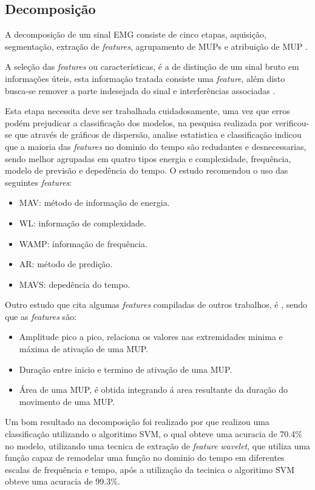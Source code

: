 \subsection{Decomposição}
A decomposição de um sinal EMG consiste de cinco etapas, aquisição, segmentação, extração de \textit{features}, agrupamento de MUPs e atribuição de MUP \cite{yousefi2014characterizing}.

A seleção das \textit{features} ou características, é a de distinção de um sinal bruto em informações úteis, esta informação tratada consiste uma \textit{feature}, além disto busca-se remover a parte indesejada do sinal e interferências associadas \cite{phinyomark2012feature}.

Esta etapa necessita deve ser trabalhada cuidadosamente, uma vez que erros podém prejudicar a classificação dos modelos, na pesquisa realizada por \cite{phinyomark2012feature} verificou-se que através de gráficos de dispersão, analise estatistica e classificação indicou que a maioria das \textit{features} no dominio do tempo são redudantes e desnecessarias, sendo melhor agrupadas em quatro tipos energia e complexidade, frequência, modelo de previsão e depedência do tempo. O estudo recomendou o uso das seguintes \textit{features}:

\begin{itemize}
    \item MAV: método de informação de energia.
    \item WL: informação de complexidade.
    \item WAMP: informação de frequência.
    \item AR: método de predição.
    \item MAVS: depedência  do tempo.
\end{itemize}

Outro estudo que cita algumas \textit{features} compiladas de outros trabalhos, é \cite{yousefi2014characterizing}, sendo que as \textit{features} são:
\begin{itemize}
    \item Amplitude pico a pico, relaciona os valores nas extremidades minima e máxima de ativação de uma MUP.
    \item Duração entre inicio e termino de ativação de uma MUP.
    \item Área de uma MUP, é obtida integrando á area resultante da duração do movimento de uma MUP.
\end{itemize}

Um bom resultado na decomposição foi realizado por \cite{yousefi2014characterizing} que realizou uma classificação utilizando o algoritimo SVM, o qual obteve uma acuracia de 70.4\% no modelo, utilizando uma tecnica de extração de \textit{feature} \textit{wavelet}, que utiliza uma função capaz de remodelar uma função no dominio do tempo em diferentes escalas de frequência e tempo, após a utilização da tecinica o algoritimo SVM obteve uma acuracia de 99.3\%.


